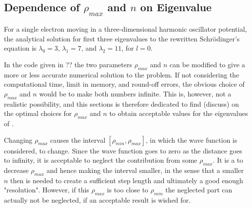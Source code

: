 \subsection{Dependence of $\rho_{max}$ and $n$ on Eigenvalue}
\label{subsec:DependenceOnEigenvalue}
For a single electron moving in a three-dimensional harmonic oscillator potential, the analytical solution for first three eigenvalues to the rewritten Schrödinger's equation 
is $\lambda_0 = 3$, $\lambda_1 = 7$, and $\lambda_2 = 11$, for  $l=0$.

In the code given in ?? the two parameters $\rho_{max}$ and $n$ can be modified to give a more or less accurate numerical solution to the problem.
If not considering the computational time, limit in memory, and round-off errors, the obvious  choice of $\rho_{max}$ and $n$ would be to make both numbers infinite. 
This is, however, not a realistic possibility, and this sections is therefore dedicated to find (discuss) on the optimal choices for $\rho_{max}$ and $n$ to obtain acceptable values for the eigenvalues of .

Changing $\rho_{max}$ causes the interval $[\rho_{min}, \rho_{max}]$, in which the wave function is considered, to change. 
Since the wave function goes to zero as the distance goes to infinity, it is acceptable to neglect the contribution from some $\rho_{max}$. 
It is a  to decrease $\rho_{max}$ and hence making the interval smaller, in the sense that a smaller $n$ then is needed to create a sufficient step length and ultimately a good enough "resolution". 
However, if this $\rho_{max}$ is too close to $\rho_{min}$ the neglected part can actually not be neglected, if an acceptable result is wished for. 

